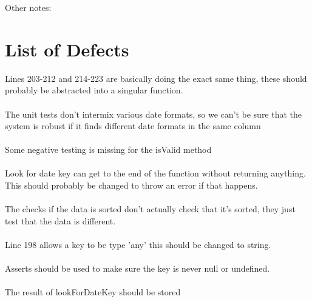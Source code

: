 \documentclass{article}
\begin{document}
Other notes: \\
    
\pagebreak

\section{List of Defects}

Lines 203-212 and 214-223 are basically doing the exact same thing, these should probably be abstracted into a singular function.\\ \\
The unit tests don't intermix various date formats, so we can't be sure that the system is robust if it finds different date formats in the same column \\ \\
Some negative testing is missing for the isValid method \\ \\
Look for date key can get to the end of the function without returning anything. This should probably be changed to throw an error if that happens. \\ \\
The checks if the data is sorted don't actually check that it's sorted, they just test that the data is different. \\ \\
Line 198 allows a key to be type 'any' this should be changed to string. \\ \\
Asserts should be used to make sure the key is never null or undefined. \\ \\
The result of lookForDateKey should be stored
\end{document}
